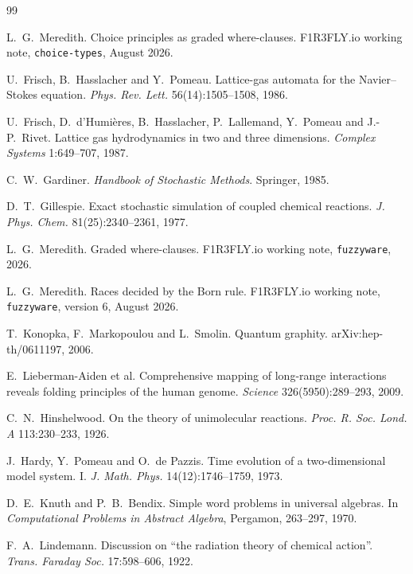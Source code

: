 \documentclass[11pt,a4paper]{article}
\theoremstyle{plain}
\theoremstyle{definition}
\theoremstyle{remark}
\begin{document}
{\raggedright
\begin{thebibliography}{99}

 L.~G.~Meredith.
Choice principles as graded where-clauses.
F1R3FLY.io working note, \texttt{choice-types}, August 2026.

 U.~Frisch, B.~Hasslacher and Y.~Pomeau.
Lattice-gas automata for the Navier--Stokes equation.
\emph{Phys. Rev. Lett.} 56(14):1505--1508, 1986.

 U.~Frisch, D.~d'Humi\`eres, B.~Hasslacher, P.~Lallemand,
Y.~Pomeau and J.-P.~Rivet.
Lattice gas hydrodynamics in two and three dimensions.
\emph{Complex Systems} 1:649--707, 1987.

 C.~W.~Gardiner.
\emph{Handbook of Stochastic Methods}. Springer, 1985.

 D.~T.~Gillespie.
Exact stochastic simulation of coupled chemical reactions.
\emph{J. Phys. Chem.} 81(25):2340--2361, 1977.

 L.~G.~Meredith.
Graded where-clauses.
F1R3FLY.io working note, \texttt{fuzzyware}, 2026.

 L.~G.~Meredith.
Races decided by the Born rule.
F1R3FLY.io working note, \texttt{fuzzyware}, version 6, August 2026.

 T.~Konopka, F.~Markopoulou and L.~Smolin.
Quantum graphity. arXiv:hep-th/0611197, 2006.

 E.~Lieberman-Aiden et al.
Comprehensive mapping of long-range interactions reveals folding principles of
the human genome. \emph{Science} 326(5950):289--293, 2009.

 C.~N.~Hinshelwood.
On the theory of unimolecular reactions.
\emph{Proc. R. Soc. Lond. A} 113:230--233, 1926.

 J.~Hardy, Y.~Pomeau and O.~de Pazzis.
Time evolution of a two-dimensional model system. I.
\emph{J. Math. Phys.} 14(12):1746--1759, 1973.

 D.~E.~Knuth and P.~B.~Bendix.
Simple word problems in universal algebras.
In \emph{Computational Problems in Abstract Algebra}, Pergamon, 263--297, 1970.

 F.~A.~Lindemann.
Discussion on ``the radiation theory of chemical action''.
\emph{Trans. Faraday Soc.} 17:598--606, 1922.


\end{thebibliography}}
\end{document}
